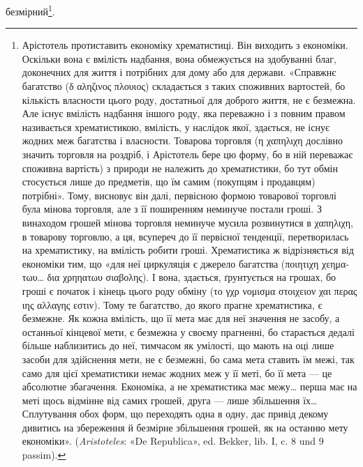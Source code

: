 безмірний\footnote{
Арістотель протиставить економіку хрематистиці. Він виходить
з економіки. Оскільки вона є вмілість надбання, вона обмежується на здобуванні
благ, доконечних для життя і потрібних для дому або для держави.
«Справжнє багатство (\textgreek{δ αληζινος πλουιος}) складається з таких споживних
вартостей, бо кількість власности цього роду, достатньої для
доброго життя, не є безмежна. Але існує вмілість надбання іншого роду,
яка переважно і з повним правом називається хрематистикою, вмілість,
у наслідок якої, здається, не існує жодних меж багатства і власности.
Товарова торговля (\textgreek{η χαπηλιχη} дослівно значить торговля на роздріб,
і Арістотель бере цю форму, бо в ній переважає споживна вартість) з природи
не належить до хрематистики, бо тут обмін стосується лише до предметів,
що їм самим (покупцям і продавцям) потрібні». Тому, висновує
він далі, первісною формою товарової торговлі була мінова торговля,
але з її поширенням неминуче постали гроші. З винаходом грошей мінова
торговля неминуче мусила розвинутися в \textgreek{χαπηλιχη}, в товарову торговлю,
а ця, всупереч до її первісної тенденції, перетворилась на хрематистику,
на вмілість робити гроші. Хрематистика ж відрізняється від економіки
тим, що «для неї циркуляція є джерело багатства (\textgreek{ποιητιχη χεηματωυ\dots{} δια χρηηατωυ σιαβολης}). І
вона, здається, ґрунтується на грошах, бо гроші є початок і кінець цього роду обміну (\textgreek{το γχρ νομισμα
στοιχειον χαι περας ιης αλλαγης εστιν}). Тому те багатство, до якого прагне хрематистика, є
безмежне. Як кожна вмілість, що її мета має для неї значення не засобу,
а останньої кінцевої мети, є безмежна у своєму прагненні, бо старається
дедалі більше наблизитись до неї, тимчасом як умілості, що мають на оці
лише засоби для здійснення мети, не є безмежні, бо сама мета ставить їм
межі, так само для цієї хрематистики немає жодних меж у її меті, бо її
мета — це абсолютне збагачення. Економіка, а не хрематистика має
межу\dots{} перша має на меті щось відмінне від самих грошей, друга — лише
збільшення їх\dots{} Сплутування обох форм, що переходять одна в одну, дає
привід декому дивитись на збереження й безмірне збільшення грошей,
як на останню мету економіки». (\emph{Aristoteles}: «De Republica», ed. Bekker,
lib. I, c. 8 und 9 passim).
}.

